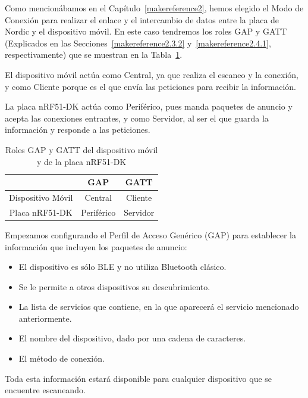 Como mencionábamos en el Capítulo~\ref{makereference2}, hemos elegido el Modo de Conexión para realizar el enlace y el intercambio de datos entre la placa de Nordic y el dispositivo móvil. En este caso tendremos los roles GAP y GATT (Explicados en las Secciones~\ref{makereference2.3.2} y~\ref{makereference2.4.1}, respectivamente) que se muestran en la Tabla~\ref{tablaRoles5}. 

El dispositivo móvil actúa como Central, ya que realiza el escaneo y la conexión, y como Cliente porque es el que envía las peticiones para recibir la información.

La placa nRF51-DK actúa como Periférico, pues manda paquetes de anuncio y acepta las conexiones entrantes, y como Servidor, al ser el que guarda la información y responde a las peticiones.

\begin{table}
	\begin{center}
	\begin{tabular}[c]{|c|c|c|}
        \hline
        & GAP & GATT \\
        \hline
        Dispositivo Móvil & Central & Cliente \\
    	\hline
    	Placa nRF51-DK & Periférico & Servidor \\
    	\hline
	\end{tabular}
    \caption{Roles GAP y GATT del dispositivo móvil y de la placa nRF51-DK}
    \label{tablaRoles5}
   \end{center}
\end{table}

Empezamos configurando el Perfil de Acceso Genérico (GAP) para establecer la información que incluyen los paquetes de anuncio:

\begin{itemize}
	\item El dispositivo es sólo BLE y no utiliza Bluetooth clásico.
	\item Se le permite a otros dispositivos su descubrimiento.
	\item La lista de servicios que contiene, en la que aparecerá el servicio mencionado anteriormente.
	\item El nombre del dispositivo, dado por una cadena de caracteres.
	\item El método de conexión.
\end{itemize}

Toda esta información estará disponible para cualquier dispositivo que se encuentre escaneando.\\

